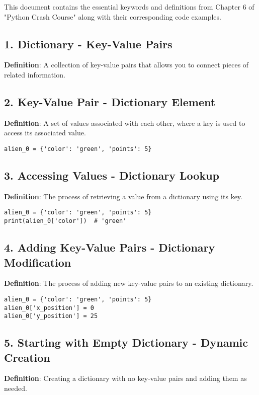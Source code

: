 
This document contains the essential keywords and definitions from Chapter 6 of "Python Crash Course" along with their corresponding code examples.

\subsection*{1. Dictionary - Key-Value Pairs}
\textbf{Definition}: A collection of key-value pairs that allows you to connect pieces of related information.



\subsection*{2. Key-Value Pair - Dictionary Element}
\textbf{Definition}: A set of values associated with each other, where a key is used to access its associated value.

\begin{lstlisting}
alien_0 = {'color': 'green', 'points': 5}
\end{lstlisting}

\subsection*{3. Accessing Values - Dictionary Lookup}
\textbf{Definition}: The process of retrieving a value from a dictionary using its key.

\begin{lstlisting}
alien_0 = {'color': 'green', 'points': 5}
print(alien_0['color'])  # 'green'
\end{lstlisting}

\subsection*{4. Adding Key-Value Pairs - Dictionary Modification}
\textbf{Definition}: The process of adding new key-value pairs to an existing dictionary.

\begin{lstlisting}
alien_0 = {'color': 'green', 'points': 5}
alien_0['x_position'] = 0
alien_0['y_position'] = 25
\end{lstlisting}

\subsection*{5. Starting with Empty Dictionary - Dynamic Creation}
\textbf{Definition}: Creating a dictionary with no key-value pairs and adding them as needed.

